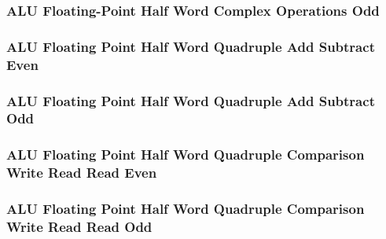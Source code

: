 

\subsubsection[{\small ALU Floating-Point Half Word Complex Operations Odd}]{ALU Floating-Point Half Word Complex Operations Odd} \label{sec:format-ALU-FHCOPO}



\subsubsection[{\small ALU Floating Point Half Word Quadruple Add Subtract Even}]{ALU Floating Point Half Word Quadruple Add Subtract Even} \label{sec:format-ALU-FHQADDE}



\subsubsection[{\small ALU Floating Point Half Word Quadruple Add Subtract Odd}]{ALU Floating Point Half Word Quadruple Add Subtract Odd} \label{sec:format-ALU-FHQADDO}



\subsubsection[{\small ALU Floating Point Half Word Quadruple Comparison Write Read Read Even}]{ALU Floating Point Half Word Quadruple Comparison Write Read Read Even} \label{sec:format-ALU-FHQCWRRE}



\subsubsection[{\small ALU Floating Point Half Word Quadruple Comparison Write Read Read Odd}]{ALU Floating Point Half Word Quadruple Comparison Write Read Read Odd} \label{sec:format-ALU-FHQCWRRO}

